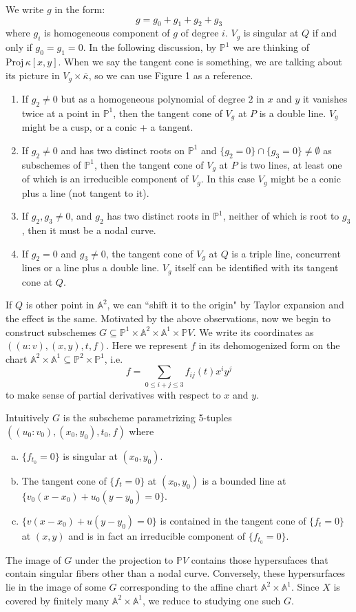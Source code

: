 \documentclass[12pt]{article}
\theoremstyle{plain}
\theoremstyle{definition}
\newcommand{\IA}{\mathbb{A}}
\newcommand{\IP}{\mathbb{P}}
\newcommand{\<}{\langle}
\renewcommand{\>}{\rangle}
\newcommand{\Proj}{\mathrm{Proj}}
\begin{document}
We write $g$ in the form:
$$ g = g_0 + g_1 + g_2 + g_3 $$
where $g_i$ is homogeneous component of $g$ of degree $i$. 
$V_g$ is singular at $Q$ if and only if $g_0 = g_1 = 0$. In the following discussion, by $\IP^1$ we are thinking of $\Proj \, \kappa[x, y]$. When we say the tangent cone is something, we are talking about its picture in $V_g \times \overline{\kappa}$, so we can use Figure 1 as a reference. 
\begin{enumerate}
\item If $g_2 \neq 0$ but as a homogeneous polynomial of degree $2$ in $x$ and $y$ it vanishes twice at a point in $\IP^1$, then the tangent cone of $V_g$ at $P$ is a double line. $V_g$ might be a cusp, or a conic + a tangent. 

\item If $g_2 \neq 0$ and has two distinct roots on $\IP^1$ and $\{g_2 = 0 \} \cap \{ g_3 = 0 \} \neq \emptyset$ as subschemes of $\IP^1$, then the tangent cone of $V_g$ at $P$ is two lines, at least one of which is an irreducible component of $V_g$. In this case $V_g$ might be a conic plus a line (not tangent to it). 

\item If $g_2, g_3 \neq 0$, and $g_2$ has two distinct roots in $\IP^1$, neither of which is root to $g_3$, then it must be a nodal curve. 

\item If $g_2 = 0$ and $g_3 \neq 0$, the tangent cone of $V_g$ at $Q$ is a triple line, concurrent lines or a line plus a double line. $V_g$ itself can be identified with its tangent cone at $Q$. 
\end{enumerate}
If $Q$ is other point in $\IA^2$, we can ``shift it to the origin" by Taylor expansion and the effect is the same. 
Motivated by the above observations, now we begin to construct subschemes $G \subseteq \IP^1 \times \IA^2 \times \IA^1 \times \IP V$. We write its coordinates as $((u : v), (x, y), t, f)$. Here we represent $f$ in its dehomogenized form on the chart $\IA^2 \times \IA^1 \subseteq \IP^2 \times \IP^1$, i.e. 
$$ f = \sum_{ 0 \le i + j \le 3} f_{ij}(t) x^i y^j $$
to make sense of partial derivatives with respect to $x$ and $y$.  

Intuitively $G$ is the subscheme parametrizing 5-tuples $((u_0 : v_0), (x_0, y_0), t_0, f)$ where 
\begin{enumerate}[a.]
\item $\{f_{t_0} = 0 \}$ is singular at $(x_0, y_0)$. 
\item The tangent cone of $\{ f_t = 0 \}$ at $(x_0, y_0)$ is a bounded line at $\{ v_0(x - x_0) + u_0(y - y_0) = 0 \}$. 
\item $\{ v(x - x_0) + u(y - y_0) = 0 \}$ is contained in the tangent cone of $\{ f_t = 0 \}$ at $(x, y)$ and is in fact an irreducible component of $\{ f_{t_0} = 0 \}$.
\end{enumerate}
The image of $G$ under the projection to $\IP V$ contains those hypersufaces that contain singular fibers other than a nodal curve. Conversely, these hypersurfaces lie in the image of some $G$ corresponding to the affine chart $\IA^2 \times \IA^1$. Since $X$ is covered by finitely many $\IA^2 \times \IA^1$, we reduce to studying one such $G$. 
\end{document}
